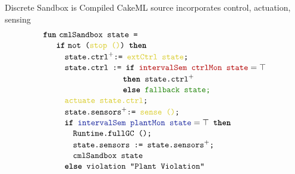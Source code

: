 \documentclass[slidestop,aspectratio=169]{beamer}
\newcommand{\CakeML}{CakeML\xspace}
\newcommand{\textbt}[1]{{\text{\ttfamily\fontseries{b}\selectfont #1}}}
\newcommand{\short}{\\[-0.03in]}
\newcommand{\extern}{myyellow}
\theoremstyle{plain}
\theoremstyle{definition}
\theoremstyle{remark}
\begin{document}
\begin{frame}[t]{Discrete Sandbox is Compiled}
  \CakeML source incorporates {\color{myyellow}{external}} control, actuation, sensing
\footnotesize\begin{align*}
\textbt{fun}&~\texttt{cmlSandbox state =}\short
&\textbt{if}~\texttt{not ({\color{myyellow}stop ()}) }\textbt{then}\short
&\quad\texttt{state.ctrl}^+ \texttt{:= {\color{\extern}extCtrl state};}\short
&\quad\texttt{state.ctrl := }\textbt{if}\texttt{ {\color{vred}intervalSem ctrlMon state}} = \top \short
&\quad\quad\qquad\qquad\qquad\textbt{then}\texttt{ state.ctrl}^+\short
&\quad\quad\qquad\qquad\qquad\textbt{else}\texttt{ {\color{vgreen}fallback state;}}\short
&\quad\texttt{{\color{\extern}actuate state.ctrl};}\short
&\quad\texttt{state.sensors}^+\texttt{:= {\color{\extern}sense ()};}\short
&\quad\textbt{if}\texttt{ {\color{vblue}intervalSem plantMon state}} = \top\texttt{ }\textbt{then} \short
&\quad\quad\texttt{Runtime.fullGC ();} \short
&\quad\quad\texttt{state.sensors := state.sensors}^+\texttt{;} \short
&\quad\quad\texttt{cmlSandbox state} \short
&\quad\textbt{else}\texttt{ violation "Plant Violation"}
\end{align*}
\end{frame}
\end{document}

